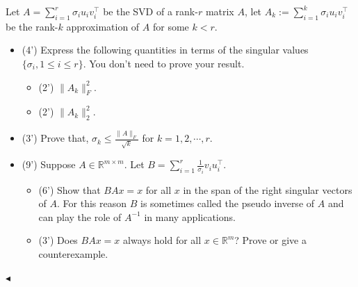 ﻿\documentclass[11pt]{article}
\newenvironment{problem}[2][Problem]{\begin{trivlist}
\item[\hskip \labelsep {\bfseries #1}\hskip \labelsep {\bfseries #2.}]}{\hfill$\blacktriangleleft$\end{trivlist}}
\begin{document}
\begin{problem}{5 (16')}
Let $A=\sum_{i=1}^{r}\sigma_iu_iv_i^\top$ be the SVD of a rank-$r$ matrix $A$, let $A_k:=\sum_{i=1}^k\sigma_iu_iv_i^\top$ be the rank-$k$ approximation of $A$ for some $k<r$. 
\begin{itemize}
    \item [(1)] (4') Express the following quantities in terms of the singular values $\{\sigma_i,1\le i\le r\}$. You don't need to prove your result.
    \begin{itemize}
        \item [(a)] (2') $\|A_k\|_F^2$.
        \item [(b)] (2') $\|A_k\|_2^2$.
    \end{itemize}
    \item [(2)] (3') Prove that, $\sigma_k\le \frac{\|A\|_F}{\sqrt{k}}$ for $k=1,2,\cdots,r$.
    \item [(3)] (9') Suppose $A\in\mathbb{R}^{m\times m}$. Let $B=\sum_{i=1}^r\frac{1}{\sigma_i}v_iu_i^\top$.  
    \begin{itemize}
        \item [(a)] (6') Show that $BAx=x$ for all $x$ in the span of the right singular vectors of $A$. For this reason $B$ is sometimes called the pseudo inverse of $A$ and can play the role of $A^{-1}$ in many applications.
        \item [(b)] (3') Does $BAx=x$ always hold for all $x\in\mathbb{R}^m$? Prove or give a counterexample.
    \end{itemize}
\end{itemize}
\end{problem}
\end{document}
